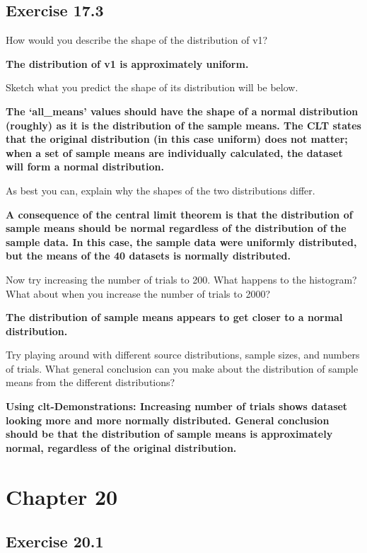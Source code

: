 \documentclass[
  openany]{krantz}
\begin{document}
\hypertarget{exercise-17.3}{%
\subsection{Exercise 17.3}\label{exercise-17.3}}

How would you describe the shape of the distribution of v1?

\textbf{The distribution of v1 is approximately uniform.}

Sketch what you predict the shape of its distribution will be below.

\textbf{The `all\_means' values should have the shape of a normal distribution (roughly) as it is the distribution of the sample means. The CLT states that the original distribution (in this case uniform) does not matter; when a set of sample means are individually calculated, the dataset will form a normal distribution.}

As best you can, explain why the shapes of the two distributions differ.

\textbf{A consequence of the central limit theorem is that the distribution of sample means should be normal regardless of the distribution of the sample data. In this case, the sample data were uniformly distributed, but the means of the 40 datasets is normally distributed.}

Now try increasing the number of trials to 200. What happens to the histogram? What about when you increase the number of trials to 2000?

\textbf{The distribution of sample means appears to get closer to a normal distribution.}

Try playing around with different source distributions, sample sizes, and numbers of trials. What general conclusion can you make about the distribution of sample means from the different distributions?

\textbf{Using clt-Demonstrations: Increasing number of trials shows dataset looking more and more normally distributed. General conclusion should be that the distribution of sample means is approximately normal, regardless of the original distribution.}

\hypertarget{chapter-20}{%
\section{Chapter 20}\label{chapter-20}}

\hypertarget{exercise-20.1}{%
\subsection{Exercise 20.1}\label{exercise-20.1}}
\end{document}

